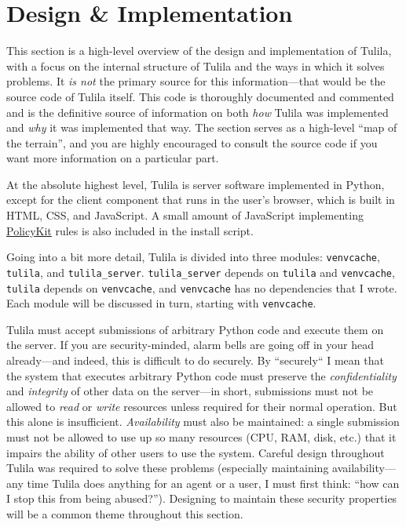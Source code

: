 \documentclass[12pt]{article}
\begin{document}
\section{Design \& Implementation}

This section is a high-level overview of the design and implementation of Tulila, with a focus on the internal structure of Tulila and the ways in which it solves problems. It \textit{is not} the primary source for this information---that would be the source code of Tulila itself. This code is thoroughly documented and commented and is the definitive source of information on both \textit{how} Tulila was implemented and \textit{why} it was implemented that way. The section serves as a high-level ``map of the terrain'', and you are highly encouraged to consult the source code if you want more information on a particular part.

At the absolute highest level, Tulila is server software implemented in Python, except for the client component that runs in the user's browser, which is built in HTML, CSS, and JavaScript. A small amount of JavaScript implementing \href{https://wiki.debian.org/PolicyKit}{PolicyKit} rules is also included in the install script.
 

Going into a bit more detail, Tulila is divided into three modules: \texttt{venvcache}, \texttt{tulila}, and \texttt{tulila\_server}. \texttt{tulila\_server} depends on \texttt{tulila} and \texttt{venvcache}, \texttt{tulila} depends on \texttt{venvcache}, and \texttt{venvcache} has no dependencies that I wrote. Each module will be discussed in turn, starting with \texttt{venvcache}.

Tulila must accept submissions of arbitrary Python code and execute them on the server. If you are security-minded, alarm bells  are going off in your head already---and indeed, this is difficult to do securely. By ``securely`` I mean that the system that executes arbitrary Python code must preserve the \textit{confidentiality} and \textit{integrity} of other data on the server---in short, submissions must not be allowed to \textit{read} or \textit{write} resources unless required for their normal operation. But this alone is insufficient. \textit{Availability} must also be maintained: a single submission must not be allowed to use up so many resources (CPU, RAM, disk, etc.) that it impairs the ability of other users to use the system. Careful design throughout Tulila was required to solve these problems (especially maintaining availability---any time Tulila does anything for an agent or a user, I must first think: ``how can I stop this from being abused?''). Designing to maintain these security properties will be a common theme throughout this section.
\end{document}
